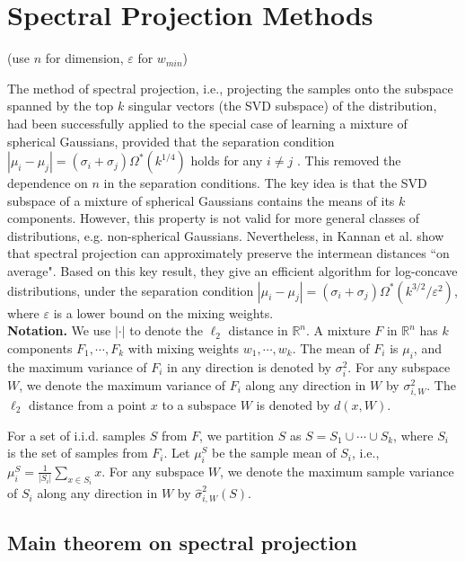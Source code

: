 \documentclass[11pt,letter]{article}
\begin{document}
\section{Spectral Projection Methods}

(use $n$ for dimension, $\varepsilon$ for $w_{min}$)

The method of spectral projection, i.e., projecting the samples onto the subspace spanned by the top $k$ singular vectors (the SVD subspace) of the distribution, had been successfully applied to the special case of learning a mixture of spherical Gaussians, provided that the separation condition $|\mu_i - \mu_j| = (\sigma_i + \sigma_j) \Omega^*(k^{1/4})$ holds for any $i\not=j$ \cite{Vempala02aspectral}. This removed the dependence on $n$ in the separation conditions. The key idea is that the SVD subspace of a mixture of spherical Gaussians contains the means of its $k$ components. However, this property is not valid for more general classes of distributions, e.g. non-spherical Gaussians.
Nevertheless, in \cite{Kannan08spectral} Kannan et al. show that spectral projection can approximately preserve the intermean distances ``on average". Based on this key result, they give an efficient algorithm for log-concave distributions, under the separation condition $|\mu_i - \mu_j| = (\sigma_i + \sigma_j) \Omega^*(k^{3/2}/\varepsilon^2)$, where $\varepsilon$ is a lower bound on the mixing weights.\\

\noindent\textbf{Notation.}
We use $|\cdot|$ to denote the $\ell_2$ distance in $\mathbb R^n$.
A mixture $F$ in $\mathbb R^n$ has $k$ components $F_1, \cdots, F_k$ with mixing weights $w_1, \cdots, w_k$. The mean of $F_i$ is $\mu_i$, and the maximum variance of $F_i$ in any direction is denoted by $\sigma_i^2$. For any subspace $W$, we denote the maximum variance of $F_i$ along any direction in $W$ by $\sigma_{i, W}^2$.
The $\ell_2$ distance from a point $x$ to a subspace $W$ is denoted by $d(x, W)$.

For a set of i.i.d. samples $S$ from $F$, we partition $S$ as $S = S_1 \cup \cdots \cup S_k$, where $S_i$ is the set of samples from $F_i$. Let $\mu_i^S$ be the sample mean of $S_i$, i.e.,
$\mu_i^S = \frac{1}{|S_i|} \sum_{x\in S_i} x$.
For any subspace $W$, we denote the maximum sample variance of $S_i$ along any direction in $W$ by $\hat \sigma_{i, W}^2(S)$.

\subsection{Main theorem on spectral projection}
\end{document}
